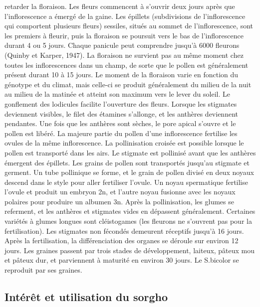 \documentclass[a4paper,11pt]{article}
\begin{document}
retarder la floraison. Les fleurs commencent à s’ouvrir deux
jours après que l’inflorescence a émergé de la gaine. Les
épillets (subdivisions de l’inflorescence qui comportent
plusieurs fleurs) sessiles, situés au sommet de l’inflorescence,
sont les premiers à fleurir, puis la floraison se poursuit vers
le bas de l’inflorescence durant 4 ou 5 jours. Chaque panicule
peut comprendre jusqu’à 6000 fleurons (Quinby et Karper,
1947). La floraison ne survient pas au même moment chez toutes
les inflorescences dans un champ, de sorte que le pollen est
généralement présent durant 10 à 15 jours. Le moment de la
floraison varie en fonction du génotype et du climat, mais
celle-ci se produit généralement du milieu de la nuit au milieu
de la matinée et atteint son maximum vers le lever du soleil. Le
gonflement des lodicules facilite l’ouverture des fleurs. Lorsque
les stigmates deviennent visibles, le filet des étamines
s’allonge, et les anthères deviennent pendantes. Une fois que les
anthères sont sèches, le pore apical s’ouvre et le pollen est
libéré. La majeure partie du pollen d’une inflorescence fertilise
les ovules de la même inflorescence. La pollinisation croisée est
possible lorsque le pollen est transporté dans les airs. Le
stigmate est pollinisé avant que les anthères émergent des
épillets. Les grains de pollen sont transportés jusqu’au stigmate
et germent. Un tube pollinique se forme, et le grain de pollen
divisé en deux noyaux descend dans le style pour aller fertiliser
l’ovule. Un noyau spermatique fertilise l’ovule et produit un
embryon 2n, et l’autre noyau fusionne avec les noyaux polaires
pour produire un albumen 3n. Après la pollinisation, les glumes
se referment, et les anthères et stigmates vides en dépassent
généralement. Certaines variétés à glumes longues sont
cléistogames (les fleurons ne s’ouvrent pas pour la
fertilisation). Les stigmates non fécondés demeurent réceptifs
jusqu’à 16 jours. Après la fertilisation, la différenciation des
organes se déroule sur environ 12 jours. Les graines passent par
trois stades de développement, laiteux, pâteux mou et pâteux dur,
et parviennent à maturité en environ 30 jours. Le S.bicolor se
reproduit par ses graines.


\subsection{Intérêt et utilisation du sorgho}
\end{document}
